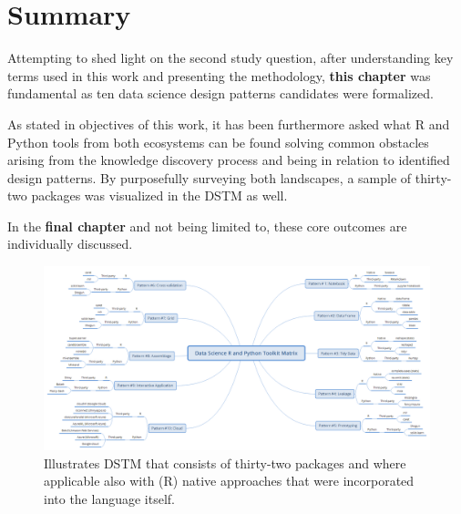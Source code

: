 \section{Summary}
Attempting to shed light on the second study question, after understanding key terms used in this work and presenting the methodology, \textbf{this chapter} was fundamental as ten data science design patterns candidates were formalized. 

As stated in objectives of this work, it has been furthermore asked what R and Python tools from both ecosystems can be found solving common obstacles arising from the knowledge discovery process and being in relation to identified design patterns. 
By purposefully surveying both landscapes, a sample of thirty-two packages was visualized in the \acl{DSTM} as well.

In the \textbf{final chapter} and not being limited to, these core outcomes are individually discussed. 

\begin{landscape}
\begin{figure}[ht]
\centering
\includegraphics[width=\textwidth,height=\textheight,scale=0.9,keepaspectratio]{images/Data_Science_R_and_Python_Toolkit_Matrix.png}
\caption[Illustrates \acl{DSTM}.]{Illustrates \acl{DSTM} that consists of thirty-two packages and where applicable also with (R) native approaches that were incorporated into the language itself.}
\label{DTSMmindmapWithout}
\end{figure}
\end{landscape}

